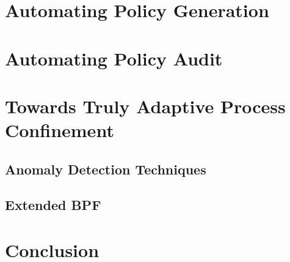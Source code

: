 \documentclass[dvipsnames, 12pt]{article}
\begin{document}
\section{Automating Policy Generation}

\section{Automating Policy Audit}

\section{Towards Truly Adaptive Process Confinement}

\subsection{Anomaly Detection Techniques}

\subsection{Extended BPF}

\section{Conclusion}


\nocite{*} %
\clearpage
\printbibliography
\end{document}
